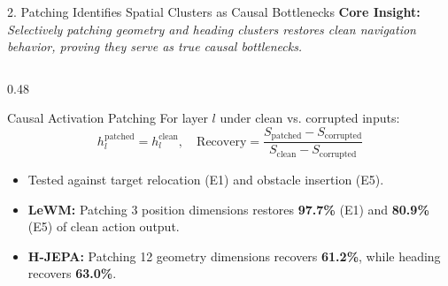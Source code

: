 \documentclass[aspectratio=169, 10pt]{beamer}
\begin{document}
\begin{frame}{2. Patching Identifies Spatial Clusters as Causal Bottlenecks}
  \textbf{Core Insight:} \textit{Selectively patching geometry and heading clusters restores clean navigation behavior, proving they serve as true causal bottlenecks.}

  \vspace{0.2cm}
  \begin{columns}[T]
    \begin{column}{0.48\textwidth}
      \begin{block}{Causal Activation Patching}
        \small
        For layer $l$ under clean vs. corrupted inputs:
        \begin{equation*}
          h_l^{\mathrm{patched}} = h_l^{\mathrm{clean}}, \quad \text{Recovery} = \frac{S_{\mathrm{patched}} - S_{\mathrm{corrupted}}}{S_{\mathrm{clean}} - S_{\mathrm{corrupted}}}
        \end{equation*}
        \begin{itemize}
          \item Tested against target relocation (E1) and obstacle insertion (E5).
          \item \textbf{LeWM:} Patching 3 position dimensions restores \textbf{97.7\%} (E1) and \textbf{80.9\%} (E5) of clean action output.
          \item \textbf{H-JEPA:} Patching 12 geometry dimensions recovers \textbf{61.2\%}, while heading recovers \textbf{63.0\%}.
        \end{itemize}
      \end{block}
    \end{column}


\end{columns}
\end{frame}
\end{document}
